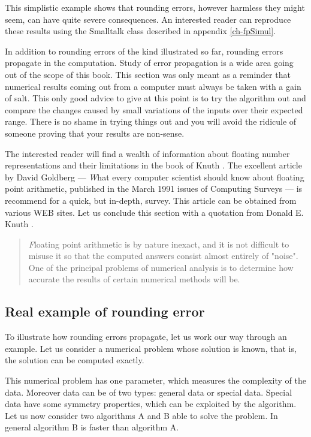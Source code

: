 This simplistic example shows that rounding errors, however
harmless they might seem, can have quite severe consequences. An
interested reader can reproduce these results using the Smalltalk
class described in appendix \ref{ch-fpSimul}.

In addition to rounding errors of the kind illustrated so far,
rounding errors propagate in the computation. Study of error
propagation is a wide area going out of the scope of this book.
This section was only meant as a reminder that numerical results
coming out from a computer must always be taken with a gain of
salt. This only good advice to give at this point is to try the
algorithm out and compare the changes caused by small variations
of the inputs over their expected range. There is no shame in
trying things out and you will avoid the ridicule of someone
proving that your results are non-sense.

The interested reader will find a wealth of information about
floating number representations and their limitations in the book
of Knuth \cite{Knuth2}. The excellent article by David Goldberg
--- {\textit What every computer scientist should know about floating
point arithmetic}, published in the March 1991 issues of Computing
Surveys --- is recommend for a quick, but in-depth, survey. This
article can be obtained from various WEB sites. Let us conclude
this section with a quotation from Donald E. Knuth \cite{Knuth2}.
\begin{quote}
{\textsl Floating point arithmetic is by nature inexact, and it is not
difficult to misuse it so that the computed answers consist almost
entirely of "noise". One of the principal problems of numerical
analysis is to determine how accurate the results of certain
numerical methods will be.}
\end{quote}

\subsection{Real example of rounding error}
\label{sec:roundingintro} To illustrate how rounding errors
propagate, let us work our way through an example. Let us consider
a numerical problem whose solution is known, that is, the solution
can be computed exactly.

This numerical problem has one parameter, which measures the
complexity of the data. Moreover data can be of two types: general
data or special data. Special data have some symmetry properties,
which can be exploited by the algorithm. Let us now consider two
algorithms A and B able to solve the problem. In general algorithm
B is faster than algorithm A.

